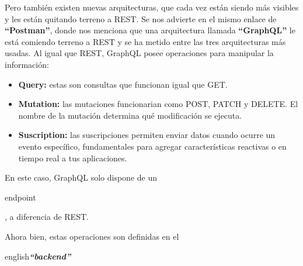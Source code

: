 Pero también existen nuevas arquitecturas, que cada vez están siendo más visibles y les están quitando terreno a REST. Se nos advierte en el mismo enlace de \textbf{``Postman''}, donde nos menciona que una arquitectura llamada \textbf{``GraphQL''} le está comiendo terreno a REST y se ha metido entre las tres arquitecturas más usadas. Al igual que REST, GraphQL posee operaciones para manipular la información:

\begin{itemize}
\item \textbf{Query:} estas son consultas que funcionan igual que GET.
\item \textbf{Mutation:} las mutaciones funcionarian como POST, PATCH y DELETE. El nombre de la mutación determina qué modificación se ejecuta.
\item \textbf{Suscription:} las suscripciones permiten enviar datos cuando ocurre un evento específico, fundamentales para agregar características reactivas o en tiempo real a tus aplicaciones. 
\end{itemize}

En este caso, GraphQL solo dispone de un \begin{otherlanguage}{english}endpoint\end{otherlanguage}, a diferencia de REST.


Ahora bien, estas operaciones son definidas en el \begin{otherlanguage}
{english}\textit{\textbf{``backend''}}\end{otherlanguage} 